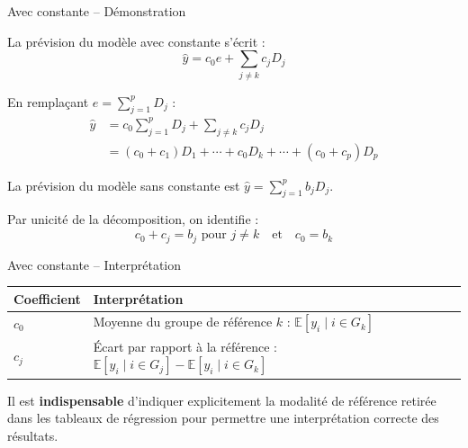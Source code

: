 \documentclass[11pt,aspectratio=169]{beamer}
\newcommand{\E}{\mathbb{E}}
\begin{document}
\begin{frame}{Avec constante -- Démonstration}

La prévision du modèle avec constante s'écrit :
\[
\hat{y} = c_0 e + \sum_{j \neq k} c_j D_j
\]

En remplaçant $e = \sum_{j=1}^{p} D_j$ :
\begin{align*}
    \hat{y} &= c_0 \sum_{j=1}^{p} D_j + \sum_{j \neq k} c_j D_j \\
    &= (c_0 + c_1) D_1 + \cdots + c_0 D_k + \cdots + (c_0 + c_p) D_p
\end{align*}

La prévision du modèle sans constante est $\hat{y} = \sum_{j=1}^{p} b_j D_j$.

Par unicité de la décomposition, on identifie :
\[
c_0 + c_j = b_j \text{ pour } j \neq k \quad \text{et} \quad c_0 = b_k
\]

\end{frame}

\begin{frame}{Avec constante -- Interprétation}

\begin{center}
    \small
    \renewcommand{\arraystretch}{1.3}
    \begin{tabular}{ll}
        \toprule
        \textbf{Coefficient} & \textbf{Interprétation} \\
        \midrule
        $c_0$ & Moyenne du groupe de référence $k$ : $\E[y_i \mid i \in G_k]$ \\
        $c_j$ & Écart par rapport à la référence : $\E[y_i \mid i \in G_j] - \E[y_i \mid i \in G_k]$ \\
        \bottomrule
    \end{tabular}
\end{center}

\vspace{0.5cm}

Il est \textbf{indispensable} d'indiquer explicitement la modalité de référence retirée dans les tableaux de régression pour permettre une interprétation correcte des résultats.

\end{frame}
\end{document}
